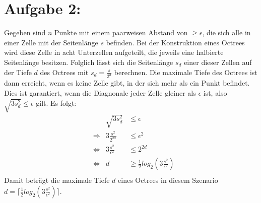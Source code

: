\section*{Aufgabe 2: }
Gegeben sind $n$ Punkte mit einem paarweisen Abstand von $\geq \epsilon$, die sich alle in einer Zelle mit der Seitenlänge $s$ befinden. Bei der Konstruktion eines Octrees wird diese Zelle in acht Unterzellen aufgeteilt, die jeweils eine halbierte Seitenlänge besitzen. Folglich lässt sich die Seitenlänge $s_d$ einer dieser Zellen auf der Tiefe $d$ des Octrees mit $s_d = \frac{s}{2^d}$ berechnen. Die maximale Tiefe des Octrees ist dann erreicht, wenn es keine Zelle gibt, in der sich mehr als ein Punkt befindet. Dies ist garantiert, wenn die Diagnonale jeder Zelle gleiner als $\epsilon$ ist, also $\sqrt{3 s_d^2} \leq \epsilon$ gilt. Es folgt:
\begin{align*}
  && \sqrt{3 s_d^2} & \leq \epsilon\\
  &\Rightarrow & 3\frac{s^2}{2^{2d}} & \leq \epsilon^2\\
  &\Leftrightarrow & 3\frac{s^2}{\epsilon^2} & \leq 2^{2d}\\
  &\Leftrightarrow & d & \geq \frac{1}{2}log_2(3\frac{s^2}{\epsilon^2})\\
\end{align*}
Damit beträgt die maximale Tiefe $d$ eines Octrees in diesem Szenario $d = \lceil \frac{1}{2}log_2(3\frac{s^2}{\epsilon^2}) \rceil$.